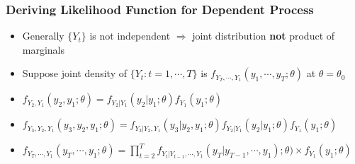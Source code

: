 \documentclass{beamer}
\begin{document}
	\begin{frame}
	\frametitle{Deriving Likelihood Function for Dependent Process}
	\begin{itemize}

	\item[] Generally $\{Y_t\}$ is not independent $\Rightarrow$  joint distribution \textbf{not} product of marginals
\pause
\vspace{16pt}
\item[] Suppose joint density of $\{Y_t: t=1,\cdots, T\}$  is $f_{Y_T,\cdots, Y_1}(y_1,\cdots, y_T; \theta) $ at $\theta=\theta_0$
\pause
\vspace{16pt}

\item[]  $f_{Y_2,Y_1}(y_2,y_1; \theta)= f_{Y_2|Y_1}(y_2| y_1;\theta) f_{Y_1}(y_1;\theta)$ 
\pause
\vspace{16pt}
\item[]  $f_{Y_3,Y_2,Y_1}(y_3,y_2,y_1; \theta)=f_{Y_3|Y_2,Y_1}(y_3|y_2, y_1;\theta)f_{Y_2|Y_1}(y_2|y_1;\theta) f_{Y_1}(y_1;\theta)$
\pause
\vspace{16pt}
\item[]
 $f_{Y_T,\cdots,Y_1}(y_T,\cdots,y_1; \theta)=\displaystyle \prod_{t=2}^{T} f_{Y_t|Y_{t-1},\cdots,Y_1}(y_T|y_{T-1},\cdots, y_1);\theta)\times  f_{Y_1}(y_1;\theta)$



\end{itemize}
\end{frame}
\end{document}
